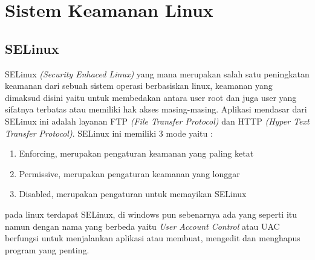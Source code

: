 \section{Sistem Keamanan Linux}
\subsection{SELinux}
	SELinux \textit{(Security Enhaced Linux)} yang mana merupakan salah satu peningkatan keamanan dari sebuah sistem operasi berbasiskan linux, keamanan yang dimaksud disini yaitu untuk membedakan antara user root dan juga user yang sifatnya terbatas atau memiliki hak akses masing-masing. Aplikasi mendasar dari SELinux ini adalah layanan FTP \textit{(File Transfer Protocol)} dan HTTP \textit{(Hyper Text Transfer Protocol)}.
SELinux ini memiliki 3 mode yaitu :
\begin{enumerate}
\item Enforcing, merupakan pengaturan keamanan yang paling ketat
\item Permissive, merupakan pengaturan keamanan yang longgar
\item Disabled, merupakan pengaturan untuk memayikan SELinux
\end{enumerate}

pada linux terdapat SELinux, di windows pun sebenarnya ada yang seperti itu namun dengan nama yang berbeda yaitu \textit{User Account Control} atau UAC berfungsi untuk menjalankan aplikasi atau membuat, mengedit dan menghapus program yang penting.

